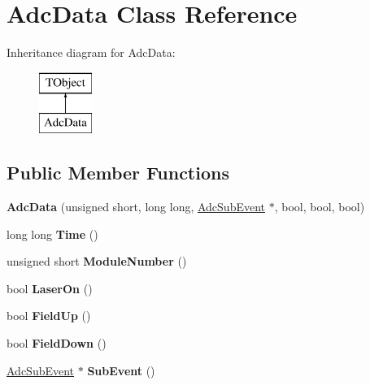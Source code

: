 \hypertarget{class_adc_data}{\section{Adc\-Data Class Reference}
\label{class_adc_data}
}
Inheritance diagram for Adc\-Data\-:\begin{figure}[H]
\begin{center}
\leavevmode
\includegraphics[height=2.000000cm]{class_adc_data}
\end{center}
\end{figure}
\subsection*{Public Member Functions}
\begin{DoxyCompactItemize}
\item 
\hypertarget{class_adc_data_a5523e3692fafaf035369a6b8c991df98}{{\bfseries Adc\-Data} (unsigned short, long long, \hyperlink{class_adc_sub_event}{Adc\-Sub\-Event} $\ast$, bool, bool, bool)}\label{class_adc_data_a5523e3692fafaf035369a6b8c991df98}

\item 
\hypertarget{class_adc_data_a2729314d57d17125c0055f7475c43c84}{long long {\bfseries Time} ()}\label{class_adc_data_a2729314d57d17125c0055f7475c43c84}

\item 
\hypertarget{class_adc_data_a026e4922b857c1015e52ecc53dc0a190}{unsigned short {\bfseries Module\-Number} ()}\label{class_adc_data_a026e4922b857c1015e52ecc53dc0a190}

\item 
\hypertarget{class_adc_data_a92ec46fe660d0e0bc3153fb736dd297d}{bool {\bfseries Laser\-On} ()}\label{class_adc_data_a92ec46fe660d0e0bc3153fb736dd297d}

\item 
\hypertarget{class_adc_data_a94785461bc83a0e6ae78d70945bf36b3}{bool {\bfseries Field\-Up} ()}\label{class_adc_data_a94785461bc83a0e6ae78d70945bf36b3}

\item 
\hypertarget{class_adc_data_a5ae609c669e0259a68c786bef783fcd7}{bool {\bfseries Field\-Down} ()}\label{class_adc_data_a5ae609c669e0259a68c786bef783fcd7}

\item 
\hypertarget{class_adc_data_a059797e6f3b3d6e65c3ee78d5b6cd3d8}{\hyperlink{class_adc_sub_event}{Adc\-Sub\-Event} $\ast$ {\bfseries Sub\-Event} ()}\label{class_adc_data_a059797e6f3b3d6e65c3ee78d5b6cd3d8}

\end{DoxyCompactItemize}
